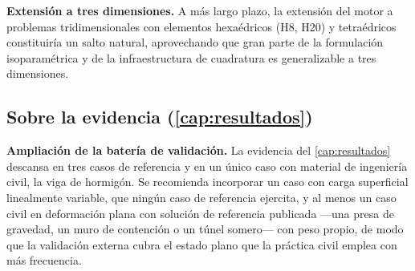 \textbf{Extensión a tres dimensiones.} A más largo plazo, la extensión del motor a problemas tridimensionales con elementos hexaédricos (H8, H20) y tetraédricos constituiría un salto natural, aprovechando que gran parte de la formulación isoparamétrica y de la infraestructura de cuadratura es generalizable a tres dimensiones.

\subsection*{Sobre la evidencia (\autoref{cap:resultados})}

\textbf{Ampliación de la batería de validación.} La evidencia del \autoref{cap:resultados} descansa en tres casos de referencia y en un único caso con material de ingeniería civil, la viga de hormigón. Se recomienda incorporar un caso con carga superficial linealmente variable, que ningún caso de referencia ejercita, y al menos un caso civil en deformación plana con solución de referencia publicada —una presa de gravedad, un muro de contención o un túnel somero— con peso propio, de modo que la validación externa cubra el estado plano que la práctica civil emplea con más frecuencia.

